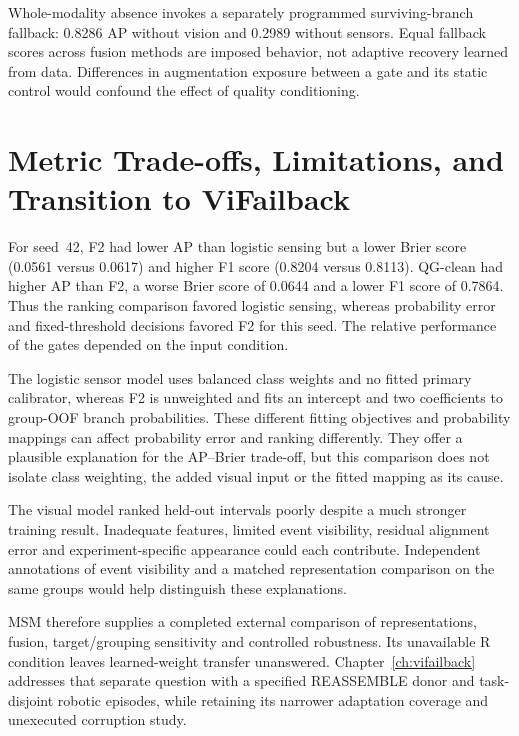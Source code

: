 Whole-modality absence invokes a separately programmed surviving-branch fallback:
0.8286 AP without vision and 0.2989 without sensors. Equal fallback scores across
fusion methods are imposed behavior, not adaptive recovery learned from data.
Differences in augmentation exposure between a gate and its static control would
confound the effect of quality conditioning.

\section{Metric Trade-offs, Limitations, and Transition to ViFailback}
For seed~42, F2 had lower AP than logistic sensing but a lower Brier score (0.0561
versus 0.0617) and higher F1 score (0.8204 versus 0.8113). QG-clean had higher AP than
F2, a worse Brier score of 0.0644 and a lower F1 score of 0.7864. Thus the ranking
comparison favored logistic sensing, whereas probability error and fixed-threshold
decisions favored F2 for this seed. The relative performance of the gates depended on
the input condition.

The logistic sensor model uses balanced class weights and no fitted primary calibrator,
whereas F2 is unweighted and fits an intercept and two coefficients to group-OOF branch
probabilities. These different fitting objectives and probability mappings can affect
probability error and ranking differently. They offer a plausible explanation for the
AP--Brier trade-off, but this comparison does not isolate class weighting, the added
visual input or the fitted mapping as its cause.

The visual model ranked held-out intervals poorly despite a much stronger training
result. Inadequate features, limited event visibility, residual alignment error and
experiment-specific appearance could each contribute. Independent annotations of event
visibility and a matched representation comparison on the same groups would help
distinguish these explanations.

MSM therefore supplies a completed external comparison of representations, fusion,
target/grouping sensitivity and controlled robustness. Its unavailable R condition
leaves learned-weight transfer unanswered. Chapter~\ref{ch:vifailback} addresses that
separate question with a specified REASSEMBLE donor and task-disjoint robotic episodes,
while retaining its narrower adaptation coverage and unexecuted corruption study.
